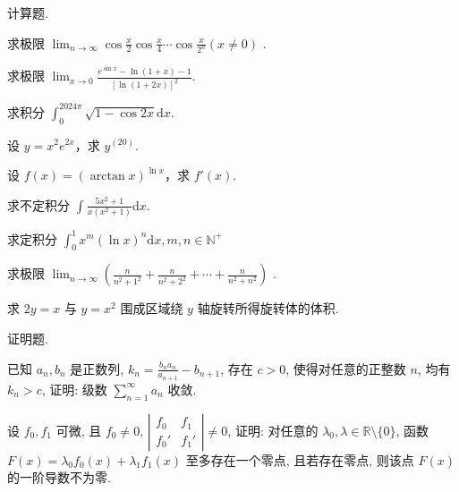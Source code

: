 \par{}
计算题.\par
求极限  $\lim_{n\to\infty}\cos\frac{x}{2}\cos\frac{x}{4}\cdots\cos\frac{x}{2^{n}}(x\neq0)$ .\par
求极限 $\lim_{x\to 0}\frac{e^{\sin x} - \ln(1 + x) - 1}{[\ln(1 + 2x)]^2}.$\par
求积分 $\int_0^{2024\pi}\sqrt{1 - \cos 2x} \mathrm{d}x.$\par
设 $y = x^{2}e^{2x}$，求 $y^{(20)}$.\par
设 $f(x) = (\arctan x)^{\ln x}$，求 $f'(x)$.\par
求不定积分 $\int \frac{5x^2 + 1}{x(x^2 + 1)}\mathrm{d}x.$\par
求定积分 $\int_0^1 x^m (\ln x)^n\mathrm{d}x,m,n\in \mathbb{N}^+$\par
求极限  $\lim_{n\to\infty}\left(\frac{n}{n^{2}+1^{2}}+\frac{n}{n^{2}+2^{2}}+\cdots+\frac{n}{n^{2}+n^{2}}\right)$ .\par
求 $2y = x$ 与 $y = x^2$ 围成区域绕 $y$ 轴旋转所得旋转体的体积.\par
\par{}
证明题.\par
已知 $a_{n}, b_{n}$ 是正数列, $k_{n} = \frac{b_{n} a_{n}}{a_{n+1}} - b_{n+1}$, 存在 $c > 0$, 使得对任意的正整数 $n$, 均有 $k_{n} > c$, 证明: 级数 $\sum_{n=1}^{\infty} a_{n}$ 收敛.\par
设 $f_0, f_1$ 可微, 且 $f_0 \neq 0$, $\left| \begin{array}{cc} f_0 & f_1 \\ f_0' & f_1' \end{array} \right| \neq 0$, 证明: 对任意的 $\lambda_0, \lambda \in \mathbb{R} \setminus \{0\}$, 函数 $F(x) = \lambda_0 f_0(x) + \lambda_1 f_1(x)$ 至多存在一个零点, 且若存在零点, 则该点 $F(x)$ 的一阶导数不为零.\par
